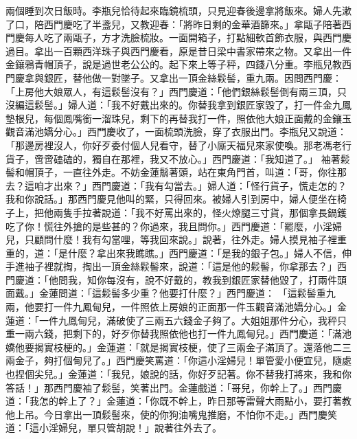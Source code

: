 兩個睡到次日飯時。李瓶兒恰待起來臨鏡梳頭，只見迎春後邊拿將飯來。婦人先漱了口，陪西門慶吃了半盞兒，又教迎春：「將昨日剩的金華酒篩來。」拿甌子陪著西門慶每人吃了兩甌子，方才洗臉梳妝。一面開箱子，打點細軟首飾衣服，與西門慶過目。拿出一百顆西洋珠子與西門慶看，原是昔日梁中書家帶來之物。又拿出一件金鑲鴉青帽頂子，說是過世老公公的。起下來上等子秤，四錢八分重。李瓶兒教西門慶拿與銀匠，替他做一對墜子。又拿出一頂金絲鬏髻，重九兩。因問西門慶： 「上房他大娘眾人，有這鬏髻沒有？」西門慶道：「他們銀絲鬏髻倒有兩三頂，只沒編這鬏髻。」婦人道：「我不好戴出來的。你替我拿到銀匠家毀了，打一件金九鳳墊根兒，每個鳳嘴銜一溜珠兒，剩下的再替我打一件，照依他大娘正面戴的金鑲玉觀音滿池嬌分心。」西門慶收了，一面梳頭洗臉，穿了衣服出門。李瓶兒又說道：「那邊房裡沒人，你好歹委付個人兒看守，替了小廝天福兒來家使喚。那老馮老行貨子，啻啻磕磕的，獨自在那裡，我又不放心。」西門慶道：「我知道了。」 袖著鬏髻和帽頂子，一直往外走。不妨金蓮鬅著頭，站在東角門首，叫道：「哥，你往那去？這咱才出來？」西門慶道：「我有勾當去。」婦人道：「怪行貨子，慌走怎的？我和你說話。」那西門慶見他叫的緊，只得回來。被婦人引到房中，婦人便坐在椅子上，把他兩隻手拉著說道：「我不好罵出來的，怪火燎腿三寸貨，那個拿長鍋鑊吃了你！慌往外搶的是些甚的？你過來，我且問你。」西門慶道：「罷麼，小淫婦兒，只顧問什麼！我有勾當哩，等我回來說。」說著，往外走。婦人摸見袖子裡重重的，道：「是什麼？拿出來我瞧瞧。」西門慶道：「是我的銀子包。」婦人不信，伸手進袖子裡就掏，掏出一頂金絲鬏髻來，說道：「這是他的鬏髻，你拿那去？」西門慶道：「他問我，知你每沒有，說不好戴的，教我到銀匠家替他毀了，打兩件頭面戴。」金蓮問道：「這鬏髻多少重？他要打什麼？」西門慶道： 「這鬏髻重九兩，他要打一件九鳳甸兒，一件照依上房娘的正面那一件玉觀音滿池嬌分心。」金蓮道：「一件九鳳甸兒，滿破使了三兩五六錢金子夠了。大姐姐那件分心，我秤只重一兩六錢，把剩下的，好歹你替我照依他也打一件九鳳甸兒。」西門慶道：「滿池嬌他要揭實枝梗的。」金蓮道：「就是揭實枝梗，使了三兩金子滿頂了。還落他二三兩金子，夠打個甸兒了。」西門慶笑罵道：「你這小淫婦兒！單管愛小便宜兒，隨處也捏個尖兒。」金蓮道：「我兒，娘說的話，你好歹記著。你不替我打將來，我和你答話！」那西門慶袖了鬏髻，笑著出門。金蓮戲道：「哥兒，你幹上了。」西門慶道：「我怎的幹上了？」金蓮道：「你既不幹上，昨日那等雷聲大雨點小，要打著教他上吊。今日拿出一頂鬏髻來，使的你狗油嘴鬼推磨，不怕你不走。」西門慶笑道：「這小淫婦兒，單只管胡說！」說著往外去了。

